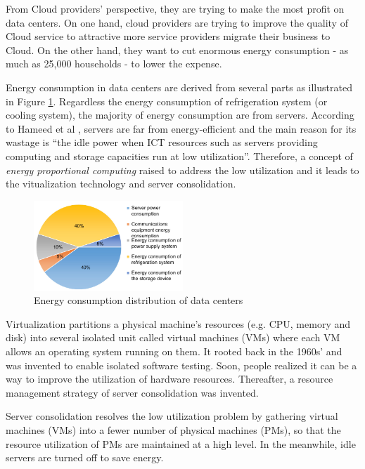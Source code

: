 From Cloud providers' perspective, they are trying to make the most profit on data centers.
On one hand, cloud providers are trying to improve the quality of  Cloud service to attractive more service providers migrate their business to Cloud.  
On the other hand, they want to cut enormous energy consumption 
- as much as 25,000 households \cite{Kaplan:up01fR-k} - to lower the expense. 

Energy consumption in data centers are derived from several parts as 
illustrated in Figure \ref{fig:consumption}. 
Regardless the energy consumption of refrigeration system (or cooling system), 
the majority of energy consumption are from servers. 
According to Hameed et al \cite{Hameed:2016cma}, 
servers are far from energy-efficient and 
the main reason for its wastage is ``the idle power when ICT resources such as servers providing computing and storage capacities run at low utilization''. Therefore, a concept of
\emph{energy proportional computing} \cite{Barroso:2007jt} raised to address the low utilization and it leads to 
the vitualization technology and server consolidation.
\begin{figure}
	\centering
	\includegraphics[width=0.5\textwidth]{pics/energyConsumption.png}
	\caption{Energy consumption distribution of data centers \cite{Rong:2016js}}
	\label{fig:consumption}
\end{figure}

Virtualization \cite{Uhlig:2005do} partitions a physical machine's resources (e.g. CPU, memory and disk) into several isolated unit called virtual machines (VMs) where each VM allows an operating system running on them. It rooted back in the 1960s' and was invented to enable isolated software testing. Soon, people realized it can be a way to improve the utilization of hardware resources. Thereafter, a resource management strategy of server consolidation was invented.

Server consolidation \cite{Zhang:2010vo} resolves the low utilization problem by gathering virtual machines (VMs) into a fewer number of physical machines (PMs), so that the resource utilization of PMs are maintained at a high level.  
In the meanwhile, idle servers are turned off to save energy.

